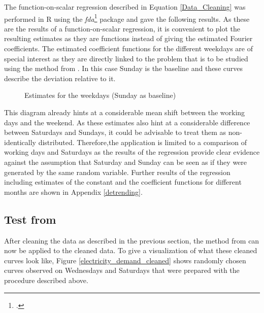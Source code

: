 \documentclass[12pt, a4paper]{article}
\theoremstyle{MAstyle} \newtheorem{assumption}{Assumption}[section]
\theoremstyle{MAstyle} \newtheorem{definition}{Definition}[section]
\theoremstyle{MAstyle} \newtheorem{theorem}{Theorem}[section]
\begin{document}
			The function-on-scalar regression described in Equation \ref{Data_Cleaning} was performed in R using the \textit{fda}\footcite{fda} package and gave the following results. As these are the results of a function-on-scalar regression, it is convenient to plot the resulting estimates as they are functions instead of giving the estimated Fourier coefficients.
			The estimated coefficient functions for the different weekdays are of special interest as they are directly linked to the problem that is to be studied using the method from \cite{bugni_permutation_2021}. In this case Sunday is the baseline and these curves describe the deviation relative to it.
			\begin{figure}[H]
				\caption{Estimates for the weekdays (Sunday as baseline)}
				\label{estimates_weekdays}
			\end{figure}
			This diagram already hints at a considerable mean shift between the working days and the weekend. As these estimates also hint at a considerable difference between Saturdays and Sundays, it could be advisable to treat them as non-identically distributed. Therefore,the application is limited to a comparison of working days and Saturdays as the results of the regression provide clear evidence against the assumption that Saturday and Sunday can be seen as if they were generated by the same random variable.
			Further results of the regression including estimates of the constant and the coefficient functions for different months are shown in Appendix \ref{detrending}.
			
		\subsection{Test from \cite{bugni_permutation_2021}}
			After cleaning the data as described in the previous section, the method from \cite{bugni_permutation_2021} can now be applied to the cleaned data.
			To give a visualization of what these cleaned curves look like, Figure \ref{electricity_demand_cleaned} shows randomly chosen curves observed on Wednesdays and Saturdays that were prepared with the procedure described above.
			
\end{document}
